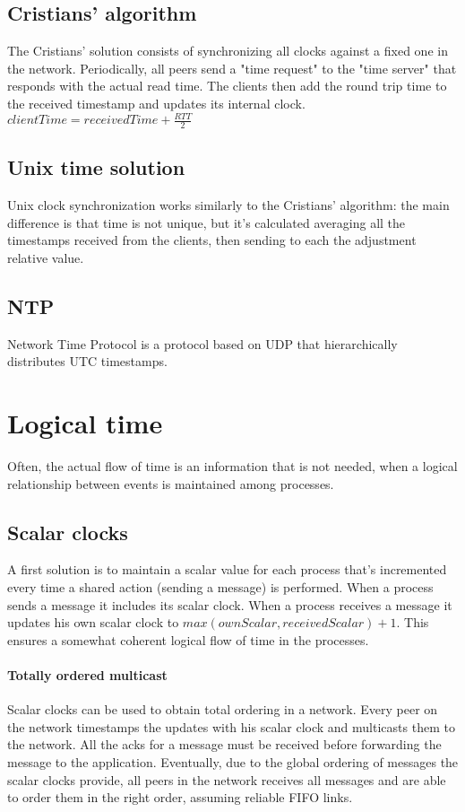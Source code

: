 \documentclass[10pt,a4paper]{article}
\begin{document}
			\subsection{Cristians' algorithm}
				The Cristians' solution consists of synchronizing all clocks against a fixed one in the network. Periodically, all peers send a "time request" to the "time server" that responds with the actual read time. The clients then add the round trip time to the received timestamp and updates its internal clock.\\ $clientTime = receivedTime + \frac{RTT}{2}$
			\subsection{Unix time solution}
				Unix clock synchronization works similarly to the Cristians' algorithm: the main difference is that time is not unique, but it's calculated averaging all the timestamps received from the clients, then sending to each the adjustment relative value.
			\subsection{NTP}
				Network Time Protocol is a protocol based on UDP that hierarchically distributes UTC timestamps.
				
		\section{Logical time}
			Often, the actual flow of time is an information that is not needed, when a logical relationship between events is maintained among processes.
			
			\subsection{Scalar clocks}
				A first solution is to maintain a scalar value for each process that's incremented every time a shared action (sending a message) is performed. When a process sends a message it includes its scalar clock. When a process receives a message it updates his own scalar clock to $max(ownScalar, receivedScalar) + 1$. This ensures a somewhat coherent logical flow of time in the processes.
				\paragraph{Totally ordered multicast}
					Scalar clocks can be used to obtain total ordering in a network. Every peer on the network timestamps the updates with his scalar clock and multicasts them to the network. All the acks for a message must be received before forwarding the message to the application. Eventually, due to the global ordering of messages the scalar clocks provide, all peers in the network receives all messages and are able to order them in the right order, assuming reliable FIFO links.
\end{document}
